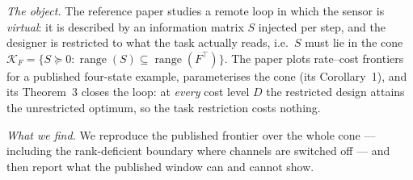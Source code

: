 \documentclass[journal]{IEEEtran}
\theoremstyle{remark}
\begin{document}
\emph{The object.} The reference paper \cite{refpaper} studies a remote loop in
which the sensor is \emph{virtual}: it is described by an information matrix $S$
injected per step, and the designer is restricted to what the task actually
reads, i.e.\ $S$ must lie in the cone
$\mathcal K_F=\{S\succeq0:\operatorname{range}(S)\subseteq
\operatorname{range}(F^{\top})\}$. The paper plots rate--cost frontiers for a
published four-state example, parameterises the cone (its Corollary~1), and its
Theorem~3 closes the loop: at \emph{every} cost level $D$ the restricted design
attains the unrestricted optimum, so the task restriction costs nothing.

\emph{What we find.} We reproduce the published frontier over the whole cone ---
including the rank-deficient boundary where channels are switched off --- and
then report what the published window can and cannot show.
\end{document}
